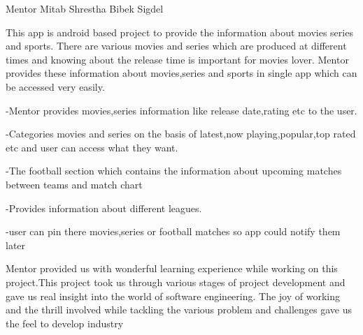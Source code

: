  \begin{conf-abstract}[]
 {Mentor}
 {Mitab Shrestha 
 	 Bibek Sigdel
 }
{}

This app is android based project to provide the information about movies series and sports. There are various movies and series which are produced at different times and knowing about the release time is important for movies lover. Mentor provides these information about movies,series and sports in single app which can be accessed very easily. 

-Mentor provides movies,series information like release date,rating etc to the user.

-Categories movies and series on the basis of latest,now playing,popular,top rated etc and user can access what they want.

-The football section which contains the information about upcoming matches between teams and match chart

-Provides information about different leagues.

-user can pin there movies,series or football matches so app could notify them later

Mentor provided us with wonderful learning experience while working on this project.This project took us through various stages of project development and gave us real insight into the world of software engineering. The joy of working and the thrill involved while tackling the various problem and challenges gave us the feel to develop industry
 \end{conf-abstract}